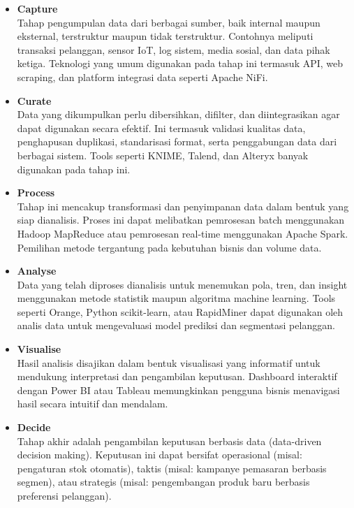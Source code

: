 \begin{itemize}
	\item \textbf{Capture} \\
	Tahap pengumpulan data dari berbagai sumber, baik internal maupun eksternal, terstruktur maupun tidak terstruktur. Contohnya meliputi transaksi pelanggan, sensor IoT, log sistem, media sosial, dan data pihak ketiga. Teknologi yang umum digunakan pada tahap ini termasuk API, web scraping, dan platform integrasi data seperti Apache NiFi.
	
	\item \textbf{Curate} \\
	Data yang dikumpulkan perlu dibersihkan, difilter, dan diintegrasikan agar dapat digunakan secara efektif. Ini termasuk validasi kualitas data, penghapusan duplikasi, standarisasi format, serta penggabungan data dari berbagai sistem. Tools seperti KNIME, Talend, dan Alteryx banyak digunakan pada tahap ini.
	
	\item \textbf{Process} \\
	Tahap ini mencakup transformasi dan penyimpanan data dalam bentuk yang siap dianalisis. Proses ini dapat melibatkan pemrosesan batch menggunakan Hadoop MapReduce atau pemrosesan real-time menggunakan Apache Spark. Pemilihan metode tergantung pada kebutuhan bisnis dan volume data.
	
	\item \textbf{Analyse} \\
	Data yang telah diproses dianalisis untuk menemukan pola, tren, dan insight menggunakan metode statistik maupun algoritma machine learning. Tools seperti Orange, Python scikit-learn, atau RapidMiner dapat digunakan oleh analis data untuk mengevaluasi model prediksi dan segmentasi pelanggan.
	
	\item \textbf{Visualise} \\
	Hasil analisis disajikan dalam bentuk visualisasi yang informatif untuk mendukung interpretasi dan pengambilan keputusan. Dashboard interaktif dengan Power BI atau Tableau memungkinkan pengguna bisnis menavigasi hasil secara intuitif dan mendalam.
	
	\item \textbf{Decide} \\
	Tahap akhir adalah pengambilan keputusan berbasis data (data-driven decision making). Keputusan ini dapat bersifat operasional (misal: pengaturan stok otomatis), taktis (misal: kampanye pemasaran berbasis segmen), atau strategis (misal: pengembangan produk baru berbasis preferensi pelanggan).
\end{itemize}

